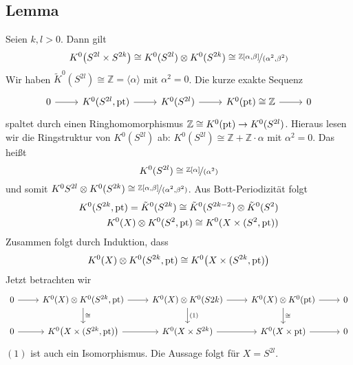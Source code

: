 \subsection{Lemma} %
\label{sub:43}
Seien $k,l >0$. Dann gilt
\[
	K^0 \enbrace*{S^{2l} \times S^{2k}} \cong K^0(S^{2l}) \otimes K^0(S^{2k}) \cong \nicefrac{\mathds{Z}[\alpha,\beta]}{(\alpha^2,\beta^2)}
\]
Wir haben $\tilde{K}^0(S^{2l}) \cong \mathds{Z} = \langle \alpha \rangle$ mit $\alpha^2=0$. Die kurze exakte Sequenz 
\[
	\begin{tikzcd}
		0 \rar & K^0(S^{2l},\pt) \rar & K^0(S^{2l}) \rar & K^0(\pt)\cong \mathds{Z} \rar & 0
	\end{tikzcd}
\]
spaltet durch einen Ringhomomorphismus $\mathds{Z} \cong K^0(\pt) \to K^0(S^{2l})$. Hieraus lesen wir die Ringstruktur von $K^0(S^{2l})$ ab: 
$K^0(S^{2l})\cong \mathds{Z} + \mathds{Z} \cdot \alpha $ mit $\alpha^2=0$. Das heißt 
\[
	K^0(S^{2l}) \cong \nicefrac{\mathds{Z}[\alpha]}{(\alpha^2)}
\]
und somit $K^0{S^{2l}} \otimes K^0(S^{2k}) \cong \nicefrac{\mathds{Z}[\alpha,\beta]}{(\alpha^2,\beta^2)}$. Aus Bott-Periodizität folgt 
\begin{align*}
	K^0(S^{2k},\pt) = \tilde{K}^0(S^{2k}) \cong \tilde{K}^0(S^{2k-2}) \otimes \tilde{K}^0(S^2) \\
	K^0(X) \otimes K^0(S^2,\pt) \cong K^0(X \times (S^2,\pt))
\end{align*}
Zusammen folgt durch Induktion, dass 
\[
	K^0(X) \otimes  K^0(S^{2k},\pt ) \cong K^0 \enbrace*{X \times (S^{2k},\pt)} 
\]
Jetzt betrachten wir
\[
	\begin{tikzcd}
		0 \rar & K^0(X) \otimes  K^0(S^{2k},\pt)\dar["\cong"] \rar & K^0(X) \otimes K^0(S{2k}) \dar["(1)"] \rar & K^0(X) \otimes K^0(\pt) \dar["\cong"] \rar & 0 \\
		0 \rar & K^0 \enbrace*{X \times (S^{2k},\pt)} \rar & K^0(X \times S^{2k}) \rar & K^0(X \times \pt) \rar & 0 
	\end{tikzcd}
\]
$(1)$ ist auch ein Isomorphismus. Die Aussage folgt für $X=S^{2l}$. \bewende

